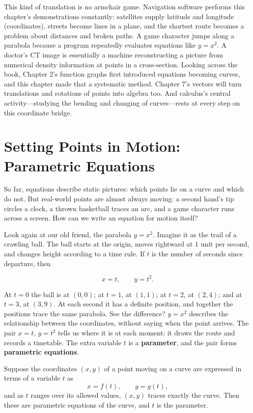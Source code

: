 \begin{lianjie}
This kind of translation is no armchair game. Navigation software performs this chapter's demonstrations constantly: satellites supply latitude and longitude (coordinates), streets become lines in a plane, and the shortest route becomes a problem about distances and broken paths. A game character jumps along a parabola because a program repeatedly evaluates equations like $y=x^{2}$. A doctor's CT image is essentially a machine reconstructing a picture from numerical density information at points in a cross-section. Looking across the book, Chapter 2's function graphs first introduced equations becoming curves, and this chapter made that a systematic method. Chapter 7's vectors will turn translations and rotations of points into algebra too. And calculus's central activity---studying the bending and changing of curves---rests at every step on this coordinate bridge.
\end{lianjie}

\section{Setting Points in Motion: Parametric Equations}

So far, equations describe static pictures: which points lie on a curve and which do not. But real-world points are almost always moving: a second hand's tip circles a clock, a thrown basketball traces an arc, and a game character runs across a screen. How can we write an equation for motion itself?

Look again at our old friend, the parabola $y=x^{2}$. Imagine it as the trail of a crawling ball. The ball starts at the origin, moves rightward at $1$ unit per second, and changes height according to a time rule. If $t$ is the number of seconds since departure, then

\[
x=t,\qquad y=t^{2}.
\]

At $t=0$ the ball is at $(0,0)$; at $t=1$, at $(1,1)$; at $t=2$, at $(2,4)$; and at $t=3$, at $(3,9)$. At each second it has a definite position, and together the positions trace the same parabola. See the difference? $y=x^{2}$ describes the relationship between the coordinates, without saying when the point arrives. The pair $x=t$, $y=t^{2}$ tells us where it is at each moment: it draws the route and records a timetable. The extra variable $t$ is a \textbf{parameter}, and the pair forms \textbf{parametric equations}.

\begin{dingyi}
Suppose the coordinates $(x,y)$ of a point moving on a curve are expressed in terms of a variable $t$ as
\[
x=f(t),\qquad y=g(t),
\]
and as $t$ ranges over its allowed values, $(x,y)$ traces exactly the curve. Then these are parametric equations of the curve, and $t$ is the parameter.
\end{dingyi}

